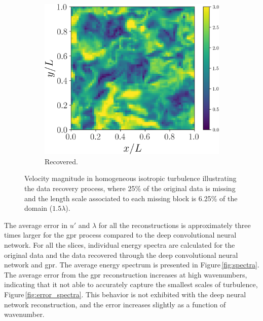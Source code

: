 \documentclass[review]{elsarticle}
\begin{document}
\begin{figure}[!tbp]
\begin{subfigure}[t]{0.32\textwidth}
  \end{subfigure}%
  \hfill%
  \begin{subfigure}[t]{0.32\textwidth}%
    \includegraphics[width=\textwidth]{./figs/umagr.png}%
    \caption{Recovered.}\label{fig:result}%
  \end{subfigure}%
  \caption{Velocity magnitude in homogeneous isotropic turbulence
    illustrating the data recovery process, where 25\% of the original
    data is missing and the length scale associated to each missing
    block is 6.25\% of the domain
    ($1.5\lambda$).}\label{fig:illustrated_hit}%
\end{figure}%

The average error in $u'$ and $\lambda$ for all the reconstructions is
approximately three times larger for the \gls{gpr} process compared to
the deep convolutional neural network. For all the slices, individual
energy spectra are calculated for the original data and the data
recovered through the deep convolutional neural network and
\gls{gpr}. The average energy spectrum is presented in
Figure\,\ref{fig:spectra}. The average error from the \gls{gpr}
reconstruction increases at high wavenumbers, indicating that it not
able to accurately capture the smallest scales of turbulence,
Figure\,\ref{fig:error_spectra}. This behavior is not exhibited with
the deep neural network reconstruction, and the error increases
slightly as a function of wavenumber.
\end{document}
